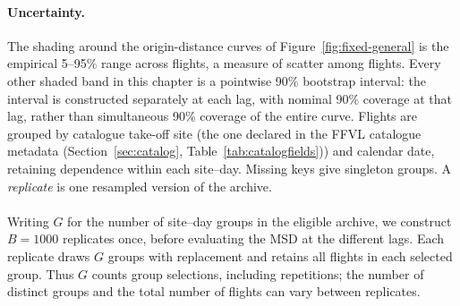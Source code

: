 \paragraph{Uncertainty.}\label{par:fixed-uncertainty} The shading around the origin-distance curves of
Figure~\ref{fig:fixed-general} is the empirical 5--95\% range across flights, a
measure of scatter among flights. Every other shaded band in this chapter is a
pointwise 90\% bootstrap interval: the interval is constructed separately at each
lag, with nominal 90\% coverage at that lag, rather than simultaneous 90\% coverage
of the entire curve. Flights are grouped by
catalogue take-off site (the one declared in the FFVL catalogue metadata
(Section~\ref{sec:catalog}, Table~\ref{tab:catalogfields})) and calendar date, retaining dependence within each site--day.
Missing keys give singleton groups.
A \emph{replicate} is one resampled version of the archive.\\\\
Writing $G$ for the number of site--day groups in the eligible archive, we construct
$B=1000$ replicates once, before evaluating the MSD at the different lags. Each
replicate draws $G$ groups with replacement and retains all flights in each selected
group. Thus $G$ counts group selections, including repetitions; the number of
distinct groups and the total number of flights can vary between replicates.

